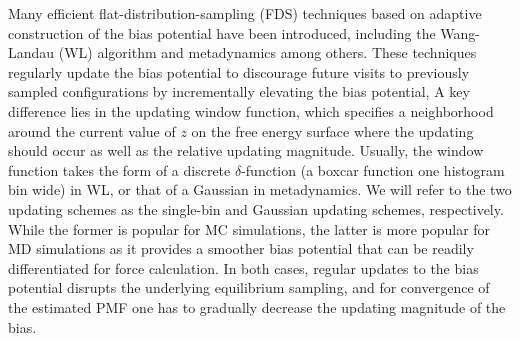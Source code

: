 \documentclass[reprint, superscriptaddress, floatfix]{revtex4-1}
\begin{document}
Many efficient flat-distribution-sampling (FDS) techniques
based on adaptive construction of the bias potential
have been introduced,
including the Wang-Landau (WL) algorithm\cite{
  wang2001, wang2001pre}
and metadynamics\cite{huber1994,
  *laio2002, *laio2008, *barducci2011, *sutto2012, micheletti2004}
among others\cite{kim2006, *kim2007, junghans2014,
  langfeld2012, pellegrini2014}.
%
%
These techniques regularly update the bias potential
to discourage future visits to previously sampled configurations
by incrementally elevating the bias potential,
%
%
A key difference lies
in the updating window function,
which specifies
a neighborhood around the current value of
$z$ on the free energy surface
where the updating should occur
as well as the relative updating magnitude.
%
Usually, the window function
takes the form of a discrete
$\delta$-function (a boxcar function one histogram bin wide)
in WL,
or that of a Gaussian
in metadynamics.
%
We will refer to the two updating schemes
as the single-bin
and Gaussian updating schemes, respectively.
%
While the former is popular for MC simulations\cite{wang2001,
  wang2001pre, kim2006, *kim2007},
the latter is more popular for MD simulations
as it provides a smoother bias potential
that can be readily differentiated for force calculation.\cite{huber1994,
  *laio2002, *laio2008, *barducci2011, *sutto2012, junghans2014}
%
%
In both cases,
regular updates to the bias potential
disrupts the underlying equilibrium
sampling\cite{zhou2005, morozov2007, zhou2008},
and for convergence of the estimated PMF
one  has to gradually decrease
the updating magnitude of the bias.
\end{document}
